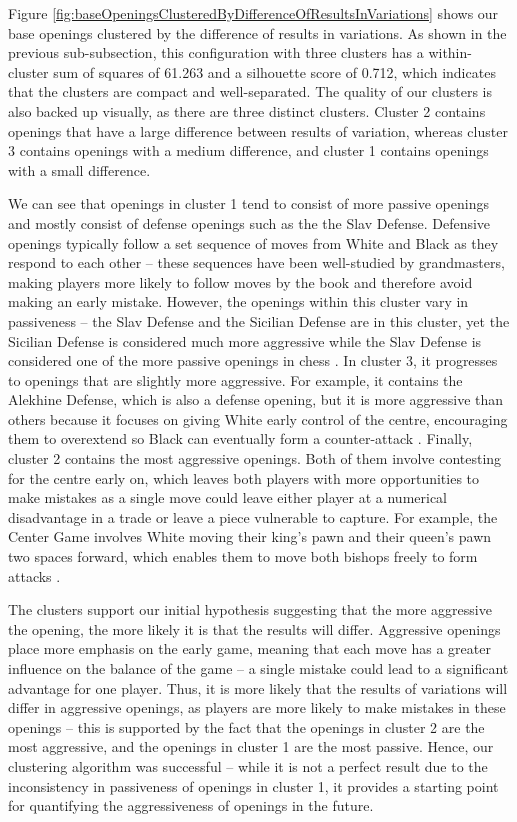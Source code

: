 \documentclass[a4paper, 11pt]{article}
\begin{document}
Figure \ref{fig:baseOpeningsClusteredByDifferenceOfResultsInVariations} shows our base openings clustered by the difference of results in variations. As shown in the previous sub-subsection, this configuration with three clusters has a within-cluster sum of squares of 61.263 and a silhouette score of 0.712, which indicates that the clusters are compact and well-separated. The quality of our clusters is also backed up visually, as there are three distinct clusters. Cluster 2 contains openings that have a large difference between results of variation, whereas cluster 3 contains openings with a medium difference, and cluster 1 contains openings with a small difference.

We can see that openings in cluster 1 tend to consist of more passive openings and mostly consist of defense openings such as the the Slav Defense. Defensive openings typically follow a set sequence of moves from White and Black as they respond to each other -- these sequences have been well-studied by grandmasters, making players more likely to follow moves by the book and therefore avoid making an early mistake. However, the openings within this cluster vary in passiveness -- the Slav Defense and the Sicilian Defense are in this cluster, yet the Sicilian Defense is considered much more aggressive while the Slav Defense is considered one of the more passive openings in chess \cite{slavDefenseAnalysis}. In cluster 3, it progresses to openings that are slightly more aggressive. For example, it contains the Alekhine Defense, which is also a defense opening, but it is more aggressive than others because it focuses on giving White early control of the centre, encouraging them to overextend so Black can eventually form a counter-attack \cite{alekhinesDefenseAnalysis}. Finally, cluster 2 contains the most aggressive openings. Both of them involve contesting for the centre early on, which leaves both players with more opportunities to make mistakes as a single move could leave either player at a numerical disadvantage in a trade or leave a piece vulnerable to capture. For example, the Center Game involves White moving their king's pawn and their queen's pawn two spaces forward, which enables them to move both bishops freely to form attacks \cite{centerGameAnalysis}.

The clusters support our initial hypothesis suggesting that the more aggressive the opening, the more likely it is that the results will differ. Aggressive openings place more emphasis on the early game, meaning that each move has a greater influence on the balance of the game -- a single mistake could lead to a significant advantage for one player. Thus, it is more likely that the results of variations will differ in aggressive openings, as players are more likely to make mistakes in these openings -- this is supported by the fact that the openings in cluster 2 are the most aggressive, and the openings in cluster 1 are the most passive. Hence, our clustering algorithm was successful -- while it is not a perfect result due to the inconsistency in passiveness of openings in cluster 1, it provides a starting point for quantifying the aggressiveness of openings in the future.
\end{document}
